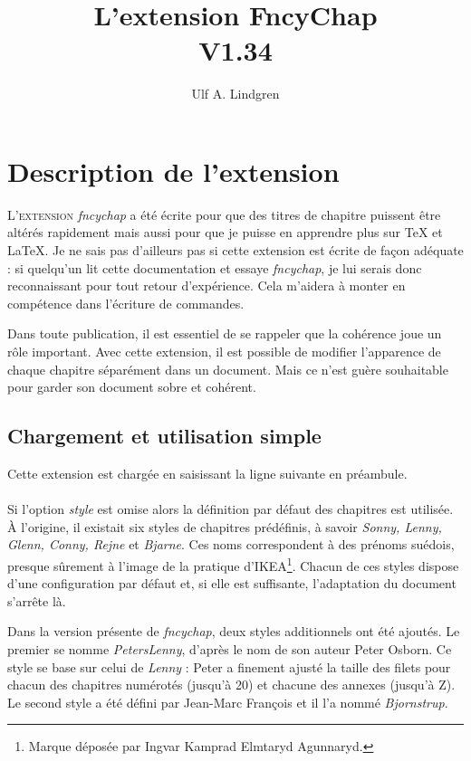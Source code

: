 \documentclass{report}
\title{L'extension FncyChap\\V1.34}
\author{Ulf A. Lindgren}
\date{}
\newcommand{\sk}{\vspace{0.2 cm}}
\newcommand{\A}[1]{{$\backslash${\tt #1}}}
\newcommand{\nsp}{\mbox{\hspace{-1 cm}}}
\begin{document}
  \maketitle
  \tableofcontents
  \chapter{Description de l'extension}
    \lettrine[findent=0.2em,nindent=0em,realheight=true]{L'}{extension} 
    \textsl{fncychap} a été écrite pour que des titres de chapitre puissent
    être altérés rapidement mais aussi pour que je puisse en apprendre plus sur
    \TeX{} et \LaTeX{}. Je ne sais pas d'ailleurs pas si cette extension est 
    écrite de façon adéquate : si quelqu'un lit cette documentation et
    essaye \textsl{fncychap}, je lui serais donc reconnaissant pour tout retour 
    d'expérience. Cela m'aidera à monter en compétence dans l'écriture de 
    commandes. 
 
    Dans toute publication, il est essentiel de se rappeler que la cohérence
    joue un rôle important. Avec cette extension, il est possible de modifier 
    l'apparence de chaque chapitre séparément dans un document. Mais ce
    n'est guère souhaitable pour garder son document sobre et cohérent.

    \section{Chargement et utilisation simple}
    Cette extension est chargée en saisissant la ligne suivante en 
    préambule.\sk\\    
    \nsp\fbox{\A{usepackage}[{\em style}]\{{\em fncychap}\}}\sk\\    
    Si l'option \emph{style} est omise alors la définition par défaut des 
    chapitres est utilisée. À l'origine, il existait six styles de chapitres
    prédéfinis, à savoir \emph{Sonny, Lenny, Glenn, Conny, Rejne} et 
    \emph{Bjarne}. Ces noms correspondent à des prénoms suédois, presque 
    sûrement à l'image de la pratique d'IKEA\footnote{Marque déposée par Ingvar
    Kamprad Elmtaryd Agunnaryd.}. Chacun de ces styles dispose d'une 
    configuration par défaut et, si elle est suffisante, l'adaptation du
    document s'arrête là.

    Dans la version présente de \textsl{fncychap}, deux styles additionnels
    ont été ajoutés. Le premier se nomme \emph{PetersLenny}, d'après le nom de
    son auteur Peter Osborn. Ce style se base sur celui de \emph{Lenny} : Peter
    a finement ajusté la taille des filets pour chacun des chapitres numérotés
    (jusqu'à 20) et chacune des annexes (jusqu'à Z). Le second style a été 
    défini par Jean-Marc François et il l'a nommé \textsl{Bjornstrup}.
\end{document}
